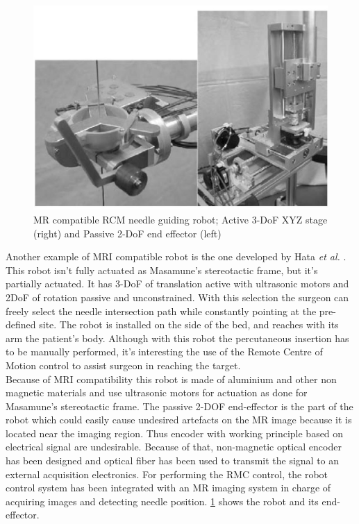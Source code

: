 \begin{figure}[h]
	\includegraphics[width=\textwidth]{images/RCM_robot.png}
	\caption[MR compatible robot with RCM]{MR compatible RCM needle guiding robot; Active 3-DoF XYZ stage (right) and Passive 2-DoF end effector (left) \cite{Hata2005}}
	\label{fig:RCM_robot.png}
\end{figure}
Another example of MRI compatible robot is the one developed by Hata \textit{et al.} \cite{Hata2005}.
This robot isn't fully actuated as Masamune's stereotactic frame, but it's partially actuated. It has 3-DoF of translation active with ultrasonic motors and 2DoF of rotation passive and unconstrained. With this selection the surgeon can freely select the needle intersection path while constantly pointing at the pre-defined site. The robot  is installed on the side of the bed, and reaches with its arm the patient's body.
Although with this robot the percutaneous insertion has to be manually performed, it's interesting the use of the Remote Centre of Motion control to assist surgeon in reaching the target.\\
Because of MRI compatibility this robot is made of aluminium and other non magnetic materials and use ultrasonic motors for actuation as done for Masamune's stereotactic frame. The passive 2-DOF end-effector is the part of the robot which could easily cause undesired artefacts on the MR image because it is located near the imaging region. Thus encoder with working principle based on electrical signal are undesirable.
Because of that, non-magnetic optical encoder has been designed and optical fiber has been used to transmit the signal to an external acquisition electronics.
For performing the RMC control, the robot control system has been integrated with an MR imaging system in charge of acquiring images and detecting needle position.
\figurename{ \ref{fig:RCM_robot.png}} shows the robot and its end-effector.

